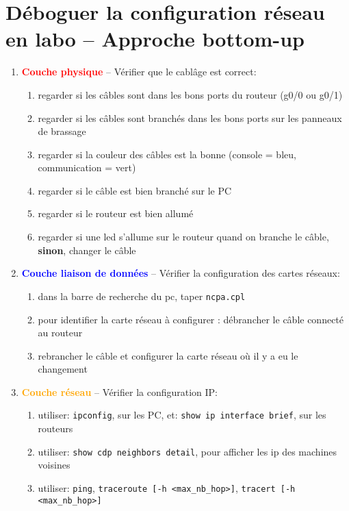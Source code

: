 \documentclass[a4paper]{article}
\begin{document}
\section{Déboguer la configuration réseau en labo -- Approche bottom-up}



\begin{enumerate}
    \item \textcolor{red}{\textbf{Couche physique}} -- Vérifier que le cablâge est correct:
    \begin{enumerate}
        \item regarder si les câbles sont dans les bons ports du routeur (g0/0 ou g0/1)
        \item regarder si les câbles sont branchés dans les bons ports sur les panneaux de brassage
        \item regarder si la couleur des câbles est la bonne (console = bleu, communication = vert)
        \item regarder si le câble est bien branché sur le PC
        \item regarder si le routeur est bien allumé
        \item regarder si une led s'allume sur le routeur quand on branche le câble, \textbf{sinon}, changer le câble
    \end{enumerate}
    \item \textcolor{blue}{\textbf{Couche liaison de données}} -- Vérifier la configuration des cartes réseaux:
    \begin{enumerate}
        \item dans la barre de recherche du pc, taper \texttt{ncpa.cpl}
        \item pour identifier la carte réseau à configurer : débrancher le câble connecté au routeur
        \item rebrancher le câble et configurer la carte réseau où il y a eu le changement
    \end{enumerate}
    \item \textcolor{orange}{\textbf{Couche réseau}} -- Vérifier la configuration IP:
    \begin{enumerate}
        \item utiliser: \texttt{ipconfig}, sur les PC, et: \texttt{show ip interface brief}, sur les routeurs
        \item utiliser: \texttt{show cdp neighbors detail}, pour afficher les ip des machines voisines
        \item utiliser: \texttt{ping}, \texttt{traceroute [-h <max\_nb\_hop>]}, \texttt{tracert [-h <max\_nb\_hop>]}

\end{enumerate}
\end{enumerate}
\end{document}
